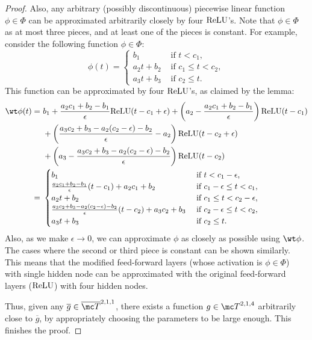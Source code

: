 \documentclass{article} %
\newcommand{\relu}{{\rm ReLU}}
\begin{document}
\begin{proof}
Also, any arbitrary (possibly discontinuous) piecewise linear function $\phi \in \Phi$ can be approximated arbitrarily closely by four $\relu$'s.
Note that $\phi \in \Phi$ as at most three pieces, and at least one of the pieces is constant.
For example, consider the following function $\phi \in \Phi$:
\begin{equation*}
    \phi(t) = 
    \begin{cases}
        b_1 & \text { if } t < c_1,\\
        a_2 t + b_2 & \text { if } c_1 \leq t < c_2,\\
        a_3 t + b_3 & \text { if } c_2 \leq t.
    \end{cases}
\end{equation*}
This function can be approximated by four $\relu$'s, as claimed by the lemma:
\begin{align*}
    \wt \phi(t) =~&
    b_1 + \frac{a_2 c_1 + b_2 - b_1}{\epsilon} \relu(t-c_1+\epsilon)
    + \left ( a_2 - \frac{a_2 c_1 + b_2 - b_1}{\epsilon} \right ) \relu(t-c_1) \\
    &+ \left ( \frac{a_3 c_2 + b_3 - a_2(c_2 - \epsilon) - b_2}{\epsilon} - a_2 \right ) \relu(t - c_2 + \epsilon)\\
    &+ \left ( a_3 - \frac{a_3 c_2 + b_3 - a_2(c_2 - \epsilon) - b_2}{\epsilon} \right ) \relu(t - c_2)\\
    =~&
    \begin{cases}
        b_1 & \text { if } t < c_1-\epsilon,\\
        \frac{a_2 c_1 + b_2 - b_1}{\epsilon} (t - c_1) + a_2c_1 + b_2 & \text { if } c_1-\epsilon \leq t < c_1,\\
        a_2 t + b_2 & \text { if } c_1 \leq t < c_2-\epsilon,\\
        \frac{a_3 c_2 + b_3 - a_2(c_2 - \epsilon) - b_2}{\epsilon} (t - c_2) + a_3 c_2 + b_3 & \text { if } c_2-\epsilon \leq t < c_2,\\
        a_3 t + b_3 & \text { if } c_2 \leq t.
    \end{cases}
\end{align*}
Also, as we make $\epsilon \rightarrow 0$, we can approximate $\phi$ as closely as possible using $\wt \phi$. The cases where the second or third piece is constant can be shown similarly. This means that the modified feed-forward layers (whose activation is $\phi \in \Phi$) with single hidden node can be approximated with the original feed-forward layers ($\relu$) with four hidden nodes.

Thus, given any $\overline{g} \in \overline{\mc T}^{2,1,1}$, there exists a function $g \in {\mc T}^{2,1,4}$ arbitrarily close to $\overline{g}$, by appropriately choosing the parameters to be large enough. This finishes the proof.
\end{proof}
\end{document}
